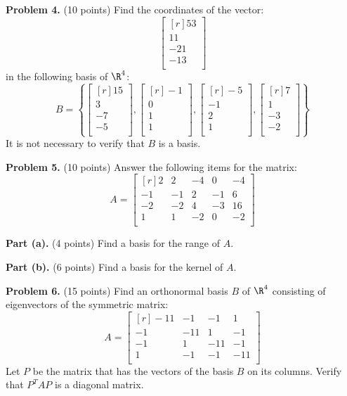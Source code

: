 \documentclass[12pt]{article}
\begin{document}
\textbf{Problem 4.} (10 points) Find the coordinates of the vector:
\[
\begin{bmatrix*}[r]53\\ 11\\ -21\\ -13\\ \end{bmatrix*}
\]
in the following basis of $\R^4$:
\[
B=\left\{
\begin{bmatrix*}[r]15\\ 3\\ -7\\ -5\\ \end{bmatrix*},\begin{bmatrix*}[r]-1\\ 0\\ 1\\ 1\\ \end{bmatrix*},\begin{bmatrix*}[r]-5\\ -1\\ 2\\ 1\\ \end{bmatrix*},\begin{bmatrix*}[r]7\\ 1\\ -3\\ -2\\ \end{bmatrix*}
\right\}
\]
It is not necessary to verify that $B$ is a basis.

\clearpage

\textbf{Problem 5.} (10 points) Answer the following items for the matrix:
\[
A = \begin{bmatrix*}[r]2&2&-4&0&-4\\-1&-1&2&-1&6\\-2&-2&4&-3&16\\1&1&-2&0&-2\\\end{bmatrix*}
\]

\textbf{Part (a).} (4 points) Find a basis for the range of $A$.

\clearpage

\textbf{Part (b).} (6 points) Find a basis for the kernel of $A$.

\clearpage

\textbf{Problem 6.} (15 points) Find an orthonormal basis $B$ of $\R^4$ consisting of eigenvectors of the symmetric matrix:
\[
A = \begin{bmatrix*}[r]-11&-1&-1&1\\-1&-11&1&-1\\-1&1&-11&-1\\1&-1&-1&-11\\\end{bmatrix*}
\]
Let $P$ be the matrix that has the vectors of the basis $B$ on its columns. Verify that $P^TAP$ is a diagonal matrix.
\end{document}
